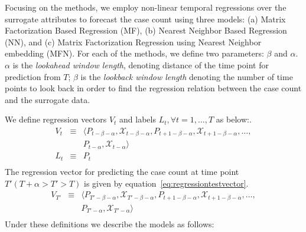 
Focusing on the methods, we employ non-linear temporal regressions
over the surrogate attributes to forecast the
case count using three models:
(a) Matrix Factorization Based Regression (MF),
(b) Nearest Neighbor Based Regression (NN),  and
(c)  Matrix Factorization Regression using Nearest Neighbor embedding (MFN).
For each of the methods, we define two parameters: $\beta$ and $\alpha$. 
$\alpha$ is the {\it lookahead window length}, denoting distance of the time point for prediction from $T$;
$\beta$ is the {\it lookback window length} denoting the number of time points to look back
in order to find the regression relation between the case count and the surrogate data.

We define regression vectors $V_t$  and 
labels $L_t,  \forall t = 1,\dots, T$ as below:.
\vspace{-1em}
\begin{equation*}
  \label{eq:regressionvector}
  \begin{array}{lcl}
    V_t & \equiv & \langle P_{t-\beta - \alpha}, \mathcal{X}_{t-\beta - \alpha}, P_{t + 1 -\beta-\alpha}, \mathcal{X}_{t + 1 - \beta-\alpha}, \dots, \\
        &        & P_{t-\alpha},\mathcal{X}_{t-\alpha} \rangle \\
    L_t & \equiv & P_{t}\\
  \end{array}
\end{equation*}
The regression vector for predicting the case count at time point $T' (T +
\alpha > T' > T)$ is given by equation~\ref{eq:regressiontestvector}.
\begin{equation}
  \label{eq:regressiontestvector}
  \begin{array}{lcl}
    V_{T'} & \equiv & \langle P_{T'-\beta - \alpha}, \mathcal{X}_{T'-\beta - \alpha}, P_{t + 1 -\beta-\alpha}, \mathcal{X}_{t + 1 - \beta-\alpha}, \dots, \\
           &        & P_{T'-\alpha},\mathcal{X}_{T'-\alpha} \rangle \\
  \end{array}
\end{equation}
\noindent
Under these definitions we describe the models as follows:
\vspace{-1em}
